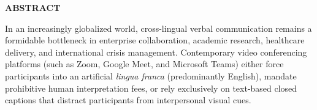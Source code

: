 \documentclass[12pt,a4paper]{report}
\begin{document}
\newpage
{}
\setcounter{page}{1}

\tableofcontents
\newpage
\listoffigures
\newpage
\listoftables

\newpage
\begin{center}
{\fontsize{16}{20}\selectfont \textbf{ABSTRACT}\par}
\end{center}

\vspace{0.5cm}
\noindent In an increasingly globalized world, cross-lingual verbal communication remains a formidable bottleneck in enterprise collaboration, academic research, healthcare delivery, and international crisis management. Contemporary video conferencing platforms (such as Zoom, Google Meet, and Microsoft Teams) either force participants into an artificial \textit{lingua franca} (predominantly English), mandate prohibitive human interpretation fees, or rely exclusively on text-based closed captions that distract participants from interpersonal visual cues.
\end{document}
